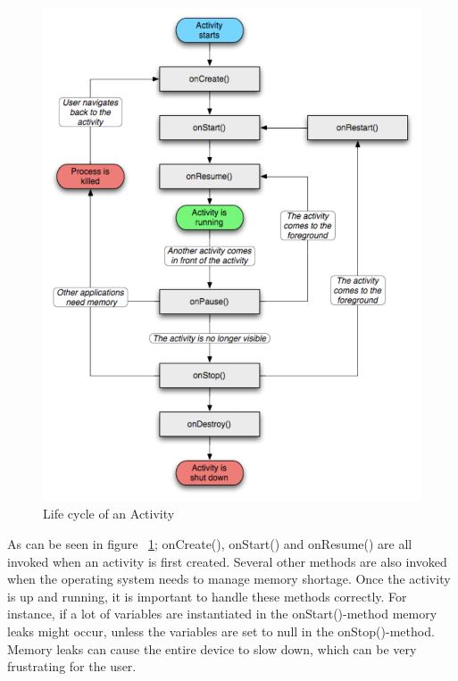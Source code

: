 \begin{figure}[here]
\begin{center}
\includegraphics[scale=0.5]{pics/chapters/chapter2/activity_lifecycle2}
\end{center}
\caption{Life cycle of an Activity}
\label{fig:androidActivityLifeCycle}
\end{figure}

As can be seen in figure ~\ref{fig:androidActivityLifeCycle}; onCreate(), onStart() and onResume() are all invoked when an activity is first created. Several other methods are also invoked when the operating system needs to manage memory shortage. Once the activity is up and running, it is important to handle these methods correctly. For instance, if a lot of variables are instantiated in the onStart()-method memory leaks might occur, unless the variables are set to null in the onStop()-method. Memory leaks can cause the entire device to slow down, which can be very frustrating for the user.
 
